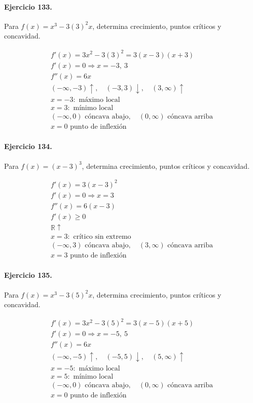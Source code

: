 \documentclass[11pt,a4paper]{article}
\begin{document}
\paragraph{Ejercicio 133.} Para $f(x)=x^3-3(3)^2x$, determina crecimiento, puntos críticos y concavidad.

\[
\begin{aligned}
f'(x)=3x^2-3(3)^2=3(x-3)(x+3)\\
f'(x)=0\Rightarrow x=-3,\ 3\\
f''(x)=6x\\
(-\infty,-3)\uparrow,\quad(-3,3)\downarrow,\quad(3,\infty)\uparrow\\
x=-3:\text{ máximo local}\\
x=3:\text{ mínimo local}\\
(-\infty,0)\text{{ cóncava abajo}},\quad(0,\infty)\text{{ cóncava arriba}}\\
x=0\text{{ punto de inflexión}}
\end{aligned}
\]


\paragraph{Ejercicio 134.} Para $f(x)=(x-3)^3$, determina crecimiento, puntos críticos y concavidad.

\[
\begin{aligned}
f'(x)=3(x-3)^2\\
f'(x)=0\Rightarrow x=3\\
f''(x)=6(x-3)\\
f'(x)\ge0\\
\mathbb{R}\uparrow\\
x=3:\text{ crítico sin extremo}\\
(-\infty,3)\text{ cóncava abajo},\quad(3,\infty)\text{ cóncava arriba}\\
x=3\text{ punto de inflexión}
\end{aligned}
\]


\paragraph{Ejercicio 135.} Para $f(x)=x^3-3(5)^2x$, determina crecimiento, puntos críticos y concavidad.

\[
\begin{aligned}
f'(x)=3x^2-3(5)^2=3(x-5)(x+5)\\
f'(x)=0\Rightarrow x=-5,\ 5\\
f''(x)=6x\\
(-\infty,-5)\uparrow,\quad(-5,5)\downarrow,\quad(5,\infty)\uparrow\\
x=-5:\text{ máximo local}\\
x=5:\text{ mínimo local}\\
(-\infty,0)\text{{ cóncava abajo}},\quad(0,\infty)\text{{ cóncava arriba}}\\
x=0\text{{ punto de inflexión}}
\end{aligned}
\]
\end{document}
